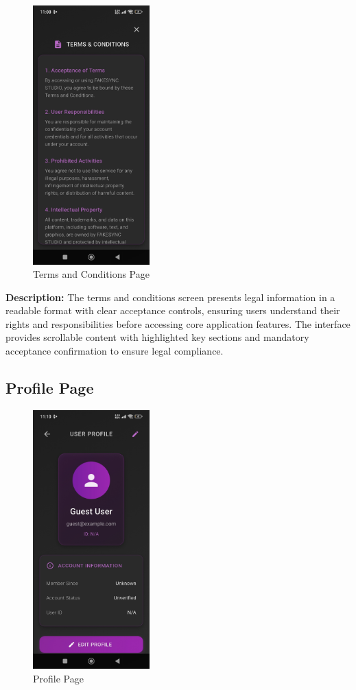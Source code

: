 \documentclass[12pt,a4paper]{report}
\begin{document}
\begin{figure}[H]
\centering
\includegraphics[width=0.4\textwidth]{figures/terms_conditions.png}
\caption{Terms and Conditions Page}
\label{fig:terms_conditions}
\end{figure}

\textbf{Description:} The terms and conditions screen presents legal information in a readable format with clear acceptance controls, ensuring users understand their rights and responsibilities before accessing core application features. The interface provides scrollable content with highlighted key sections and mandatory acceptance confirmation to ensure legal compliance.

\subsection{Profile Page}

\begin{figure}[H]
\centering
\includegraphics[width=0.4\textwidth]{figures/profile_page.png}
\caption{Profile Page}
\label{fig:profile_page}
\end{figure}
\end{document}
